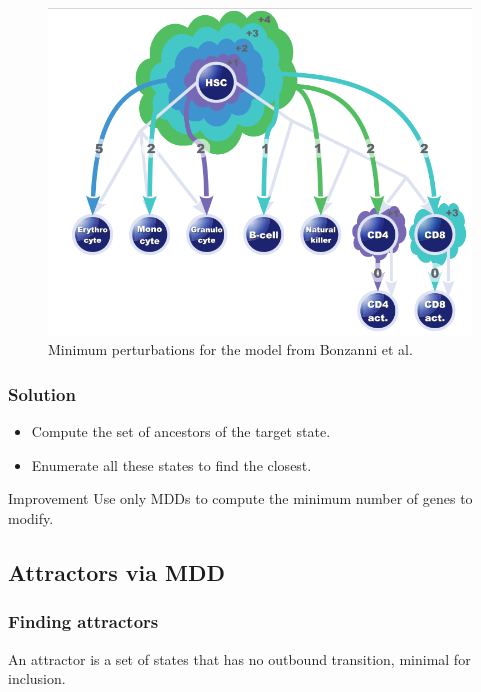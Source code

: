 \documentclass{beamer}
\begin{document}
\begin{frame}
  \begin{figure}
    \includegraphics[scale=0.35]{img/push}
    \caption{Minimum perturbations for the model from Bonzanni et al.}
  \end{figure}
\end{frame}

\begin{frame}
  \frametitle{Solution}
  \begin{itemize}
  \item Compute the set of ancestors of the target state.
    \bigskip
    
  \item Enumerate all these states to find the closest.
  \end{itemize}
  \bigskip
  
  \begin{block}{Improvement}
    Use only MDDs to compute the minimum number of genes to modify.
  \end{block}
\end{frame}


\subsection{Attractors via MDD}

\begin{frame}
  \frametitle{Finding attractors}
  \begin{definition}
    An attractor is a set of states that has no outbound transition, minimal for inclusion.
  \end{definition}
\end{frame}
\end{document}
